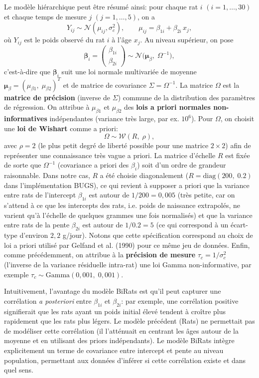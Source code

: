 \documentclass[12pt]{article}
\begin{document}
Le modèle hiérarchique peut être résumé ainsi: pour chaque rat $i$ $(i=1,\dots,30)$ et chaque temps de mesure $j$ $(j=1,\dots,5)$, on a
\[ Y_{ij} \sim \mathcal{N}(\mu_{ij}, \sigma_c^2), \qquad \mu_{ij} = \beta_{1i} + \beta_{2i}\,x_{j}, \]
où $Y_{ij}$ est le poids observé du rat $i$ à l’âge $x_{j}$. Au niveau supérieur, on pose 
\[ \boldsymbol{\beta}_{i} = 
\begin{pmatrix}\beta_{1i}\\\beta_{2i}\end{pmatrix} \sim \mathcal{N}\!\Big( \boldsymbol{\mu}_{\beta},\;\Omega^{-1}\Big), \] 
c’est-à-dire que $\boldsymbol{\beta}_{i}$ suit une loi normale multivariée de moyenne $\boldsymbol{\mu}_{\beta}=(\mu_{\beta1},\;\mu_{\beta2})^T$ et de matrice de covariance $\Sigma = \Omega^{-1}$. La matrice $\Omega$ est la \textbf{matrice de précision} (inverse de $\Sigma$) commune de la distribution des paramètres de régression. On attribue à $\mu_{\beta1}$ et $\mu_{\beta2}$ des \textbf{lois a priori normales non-informatives} indépendantes (variance très large, par ex. $10^6$). Pour $\Omega$, on choisit une \textbf{loi de Wishart} comme a priori:
\[ \Omega \sim \mathcal{W}(R,\;\rho), \] 
avec $\rho=2$ (le plus petit degré de liberté possible pour une matrice $2\times2$) afin de représenter une connaissance très vague a priori. La matrice d’échelle $R$ est fixée de sorte que $\Omega^{-1}$ (covariance a priori des $\beta_i$) soit d’un ordre de grandeur raisonnable. Dans notre cas, $R$ a été choisie diagonalement ($R=\mathrm{diag}(200,\;0.2)$ dans l’implémentation BUGS), ce qui revient à supposer a priori que la variance entre rats de l’intercept $\beta_{1i}$ est autour de $1/200=0,005$ (très petite, car on s’attend à ce que les intercepts des rats, i.e. poids de naissance extrapolés, ne varient qu’à l’échelle de quelques grammes une fois normalisés) et que la variance entre rats de la pente $\beta_{2i}$ est autour de $1/0.2=5$ (ce qui correspond à un écart-type d’environ $2,2$ g/jour). Notons que cette spécification correspond au choix de loi a priori utilisé par Gelfand et al. (1990) pour ce même jeu de données. Enfin, comme précédemment, on attribue à la \textbf{précision de mesure} $\tau_c = 1/\sigma_c^2$ (l’inverse de la variance résiduelle intra-rat) une loi Gamma non-informative, par exemple $\tau_c \sim \text{Gamma}(0,001,\;0,001)$.

Intuitivement, l’avantage du modèle BiRats est qu’il peut capturer une corrélation \emph{a posteriori} entre $\beta_{1i}$ et $\beta_{2i}$: par exemple, une corrélation positive signifierait que les rats ayant un poids initial élevé tendent à croître plus rapidement que les rats plus légers. Le modèle précédent (Rats) ne permettait pas de modéliser cette corrélation (il l’atténuait en centrant les âges autour de la moyenne et en utilisant des priors indépendants). Le modèle BiRats intègre explicitement un terme de covariance entre intercept et pente au niveau population, permettant aux données d’inférer si cette corrélation existe et dans quel sens.
\end{document}
